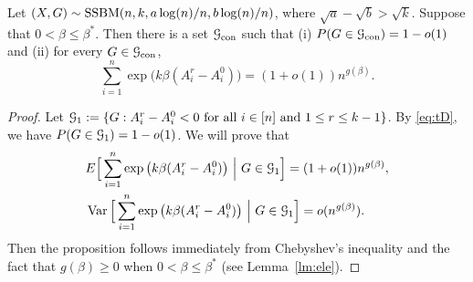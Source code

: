 \documentclass{article}
\begin{document}
\begin{proposition}  \label{prop:con}
Let $(X,G)\sim \operatorname{SSBM}(n,k, a\log(n)/n, b\log(n)/n)$, where $\sqrt{a}-\sqrt{b} > \sqrt{k}$.
Suppose that $0< \beta\le \beta^\ast$.
Then there is a set $\mathcal{G}_{\operatorname{con}}$ such that (i) $P(G \in \mathcal{G}_{\operatorname{con}}) = 1-o(1)$ and (ii) for every $G\in \mathcal{G}_{\operatorname{con}}$, 
$$
\sum_{i=1}^n \exp\big(k\beta (A^r_i-A^0_i) \big)
=(1+o(1)) n^{g(\beta)} .
$$
\end{proposition}

\begin{proof}
Let $\mathcal{G}_1:=\{G:A^r_i-A^0_i<0\text{~for all~}i\in[n] \text{ and } 1\leq r \leq k-1 \}$. By \eqref{eq:tD}, we have $P(G\in\mathcal{G}_1)=1-o(1)$. We will prove that
\begin{align}
& E \Big[ \sum_{i=1}^n  \exp\big(k\beta (A^r_i-A^0_i) \big) ~\Big|~ G\in\mathcal{G}_1 \Big]
= (1+o(1)) n^{g(\beta)}  , \label{eq:cg} \\
& \operatorname{Var} \Big[ \sum_{i=1}^n  \exp\big(k\beta (A^r_i-A^0_i) \big) ~\Big|~ G\in\mathcal{G}_1 \Big]
= o (n^{g(\beta)} ) .  \label{eq:sw}
\end{align}
Then the proposition follows immediately from  Chebyshev's inequality and the fact that $g(\beta)\ge 0$ when $0<\beta\le\beta^\ast$ (see Lemma~\ref{lm:ele}).



\end{proof}
\end{document}
